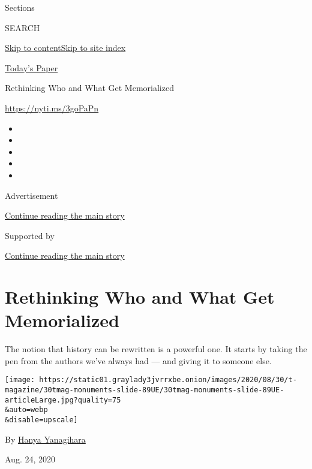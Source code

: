 Sections

SEARCH

\protect\hyperlink{site-content}{Skip to
content}\protect\hyperlink{site-index}{Skip to site index}

\href{https://myaccount.nytimes3xbfgragh.onion/auth/login?response_type=cookie\&client_id=vi}{}

\href{https://www.nytimes3xbfgragh.onion/section/todayspaper}{Today's
Paper}

Rethinking Who and What Get Memorialized

\url{https://nyti.ms/3goPaPn}

\begin{itemize}
\item
\item
\item
\item
\item
\end{itemize}

Advertisement

\protect\hyperlink{after-top}{Continue reading the main story}

Supported by

\protect\hyperlink{after-sponsor}{Continue reading the main story}

\hypertarget{rethinking-who-and-what-get-memorialized}{%
\section{Rethinking Who and What Get
Memorialized}\label{rethinking-who-and-what-get-memorialized}}

The notion that history can be rewritten is a powerful one. It starts by
taking the pen from the authors we've always had --- and giving it to
someone else.

\texttt{[image: https://static01.graylady3jvrrxbe.onion/images/2020/08/30/t-magazine/30tmag-monuments-slide-89UE/30tmag-monuments-slide-89UE-articleLarge.jpg?quality=75\\\&auto=webp\\\&disable=upscale]}

By \href{https://www.nytimes3xbfgragh.onion/by/hanya-yanagihara}{Hanya
Yanagihara}

Aug. 24, 2020

